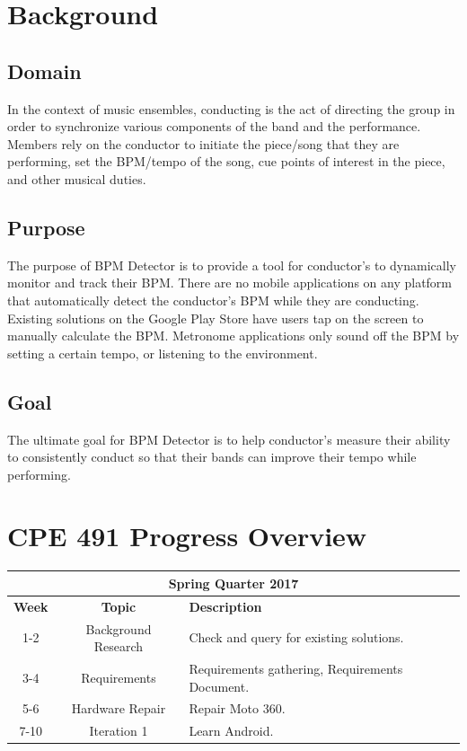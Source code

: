 \documentclass[12pt]{article}
\begin{document}
\section{Background}
\subsection{Domain}
In the context of music ensembles, conducting is the act of directing the group in order to synchronize various components of the band and the performance. Members rely on the conductor to initiate the piece/song that they are performing, set the BPM/tempo of the song, cue points of interest in the piece, and other musical duties. 

\subsection{Purpose}
The purpose of BPM Detector is to provide a tool for conductor's to dynamically monitor and track their BPM. There are no mobile applications on any platform that automatically detect the conductor's BPM while they are conducting. Existing solutions on the Google Play Store have users tap on the screen to manually calculate the BPM. Metronome applications only sound off the BPM by setting a certain tempo, or listening to the environment.

\subsection{Goal}
The ultimate goal for BPM Detector is to help conductor's measure their ability to consistently conduct so that their bands can improve their tempo while performing.

\newpage
\section{CPE 491 Progress Overview}
\begin{center}
  \begin{tabular}{ |c|c|p{4in}| } 
  \hline 
  \multicolumn{3}{|c|}{\textbf{Spring Quarter 2017}} \\
  \hline
  \textbf{Week} & \textbf{Topic} & \textbf{Description} \\ 
  \hline
  1-2 & Background Research & Check and query for existing solutions. \\
  \hline
  3-4 & Requirements & Requirements gathering, Requirements Document. \\
  \hline
  5-6 & Hardware Repair & Repair Moto 360. \\
  \hline 
  7-10 & Iteration 1 & Learn Android. \\
  \hline
  \end{tabular}
\end{center}
\end{document}
